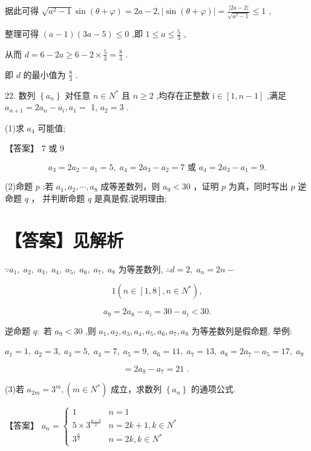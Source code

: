 \documentclass[10pt]{article}
\begin{document}
据此可得 \(\sqrt{{a}^{2} - 1}\sin \left( {\theta  + \varphi }\right)  = {2a} - 2,\left| {\sin \left( {\theta  + \varphi }\right) }\right|  = \frac{\left| 2a - 2\right| }{\sqrt{{a}^{2} - 1}} \leq  1\) ,

整理可得 \(\left( {a - 1}\right) \left( {{3a} - 5}\right)  \leq  0\) ,即 \(1 \leq  a \leq  \frac{5}{3}\) ,

从而 \(d = 6 - {2a} \geq  6 - 2 \times  \frac{5}{3} = \frac{8}{3}\) .

即 \(d\) 的最小值为 \(\frac{8}{3}\) .

22. 数列 \(\left\{  {a}_{n}\right\}\) 对任意 \(n \in  {N}^{ * }\) 且 \(n \geq  2\) ,均存在正整数 \(\mathrm{i} \in  \left\lbrack  {1,n - 1}\right\rbrack\) ,满足 \({a}_{n + 1} = 2{a}_{n} - {a}_{i},{a}_{1} =\) 1, \({a}_{2} = 3\) .

(1)求 \({a}_{4}\) 可能值;

【答案】 7 或 9

\[
{a}_{3} = 2{a}_{2} - {a}_{1} = 5,\;{a}_{4} = 2{a}_{3} - {a}_{2} = 7\text{ 或 }{a}_{4} = 2{a}_{3} - {a}_{1} = 9.
\]

(2)命题 \(p\) :若 \({a}_{1},{a}_{2},\cdots ,{a}_{8}\) 成等差数列，则 \({a}_{9} < {30}\) ，证明 \(p\) 为真，同时写出 \(p\) 逆命题 \(q\) ， 并判断命题 \(q\) 是真是假,说明理由;

\section*{【答案】见解析}

\(\because {a}_{1},\;{a}_{2},\;{a}_{3},\;{a}_{4},\;{a}_{5},\;{a}_{6},\;{a}_{7},\;{a}_{8}\) 为等差数列, \(\therefore d = 2,\;{a}_{n} = {2n} -\)

\[
1\left( {n \in  \left\lbrack  {1,8}\right\rbrack  ,n \in  {N}^{ * }}\right) ,
\]

\[
{a}_{9} = 2{a}_{8} - {a}_{i} = {30} - {a}_{i} < {30}.
\]

逆命题 \(q :\) 若 \({a}_{9} < {30}\) ,则 \({a}_{1},{a}_{2},{a}_{3},{a}_{4},{a}_{5},{a}_{6},{a}_{7},{a}_{8}\) 为等差数列是假命题, 举例:

\({a}_{1} = 1,\;{a}_{2} = 3,\;{a}_{3} = 5,\;{a}_{4} = 7,\;{a}_{5} = 9,\;{a}_{6} = {11},\;{a}_{7} = {13},\;{a}_{8} = 2{a}_{7} - {a}_{5} = {17},\;{a}_{9}\)

\[
= 2{a}_{8} - {a}_{7} = {21}\text{ . }
\]

(3)若 \({a}_{2m} = {3}^{m},\left( {m \in  {N}^{ * }}\right)\) 成立，求数列 \(\left\{  {a}_{n}\right\}\) 的通项公式.

【答案】 \({a}_{n} = \left\{  \begin{matrix} 1 & n = 1 \\  5 \times  {3}^{\frac{n - 3}{2}} & n = {2k} + 1,k \in  {N}^{ * } \\  {3}^{\frac{n}{2}} & n = {2k},k \in  {N}^{ * } \end{matrix}\right.\)
\end{document}
